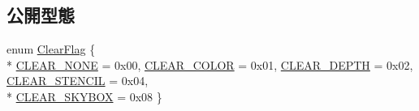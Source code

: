 \subsection*{公開型態}
\begin{DoxyCompactItemize}
\item 
enum \hyperlink{class_magnum_1_1_camera_component_af55863c6ee2da0eca8fcafaf55dd2da4}{Clear\+Flag} \{ \\*
\hyperlink{class_magnum_1_1_camera_component_af55863c6ee2da0eca8fcafaf55dd2da4a7ee3a6cb3c87e42c930211e61a79e293}{C\+L\+E\+A\+R\+\_\+\+N\+O\+NE} = 0x00, 
\hyperlink{class_magnum_1_1_camera_component_af55863c6ee2da0eca8fcafaf55dd2da4acfd7ec2881297cd462644631c6db2f65}{C\+L\+E\+A\+R\+\_\+\+C\+O\+L\+OR} = 0x01, 
\hyperlink{class_magnum_1_1_camera_component_af55863c6ee2da0eca8fcafaf55dd2da4a600ae87aceccfbbbeadc2770cbefbd77}{C\+L\+E\+A\+R\+\_\+\+D\+E\+P\+TH} = 0x02, 
\hyperlink{class_magnum_1_1_camera_component_af55863c6ee2da0eca8fcafaf55dd2da4a1ab7e868ebd612f7b8e65bcc0b1d0501}{C\+L\+E\+A\+R\+\_\+\+S\+T\+E\+N\+C\+IL} = 0x04, 
\\*
\hyperlink{class_magnum_1_1_camera_component_af55863c6ee2da0eca8fcafaf55dd2da4aec7274a40367493371d34665a0591561}{C\+L\+E\+A\+R\+\_\+\+S\+K\+Y\+B\+OX} = 0x08
 \}
\end{DoxyCompactItemize}

